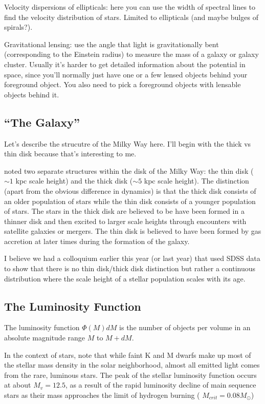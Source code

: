 \begin{enumerate}
      Velocity dispersions of ellipticals: here you can use the width of spectral lines to find the velocity distribution of stars. Limited to ellipticals (and maybe bulges of spirals?).
      
      Gravitational lensing: use the angle that light is gravitationally bent (corresponding to the Einstein radius) to measure the mass of a galaxy or galaxy cluster. Usually it's harder to get detailed information about the potential in space, since you'll normally just have one or a few lensed objects behind your foreground object. You also need to pick a foreground objects with lensable objects behind it.
      
\end{enumerate}

\subsection{``The Galaxy''}

Let's describe the strucutre of the Milky Way here.  I'll begin with the thick vs thin disk
because that's interesting to me.

 noted two separate structures within the disk of the
Milky Way: the thin disk ($\sim1$ kpc scale height) and the thick disk
($\sim5$ kpc scale height).  The distinction (apart from the obvious difference in dynamics)
is that the thick disk consists of an older population of stars while the thin disk consists
of a younger population of stars.
The stars in the thick disk are believed to be have been formed in a thinner disk and then
excited to larger scale heights through encounters with satellite galaxies or mergers.
The thin disk is believed to have been formed by gas
accretion at later times during the formation of the galaxy.

I believe we had a colloquium earlier this year (or last year) that used SDSS data to show
that there is no thin disk/thick disk distinction but rather a continuous distribution
where the scale height of a stellar population scales with its age.

\subsection{The Luminosity Function}

The luminosity function $\Phi(M)dM$ is the number of objects per volume in an absolute magnitude range $M$ to $M+dM$. 

In the context of stars, note that while faint K and M dwarfs make up most of the stellar mass density in the solar neighborhood, almost all emitted light comes from the rare, luminous stars. The peak of the stellar luminosity function occurs at about $M_v = 12.5$, as a result of the rapid luminosity decline of main sequence stars as their mass approaches the limit of hydrogen burning ( $M_{crit} = 0.08 M_\odot$)

